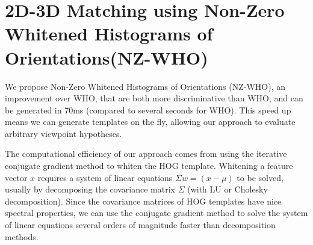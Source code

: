 \documentclass[10pt,twocolumn,letterpaper]{article}
\begin{document}

\section{2D-3D Matching using Non-Zero Whitened Histograms of Orientations(NZ-WHO)}
\label{sec:nz-who}

We propose Non-Zero Whitened Histograms of Orientations (NZ-WHO), an improvement over WHO, that are both more discriminative than WHO, and can be generated in 70ms (compared to several seconds for WHO). This speed up means we can generate templates on the fly, allowing our approach to evaluate arbitrary viewpoint hypotheses. 

The computational efficiency of our approach comes from using the iterative conjugate gradient method to whiten the HOG template. Whitening a feature vector $x$ requires a system of linear equations $\Sigma w = (x - \mu)$ to be solved, usually by decomposing the covariance matrix $\Sigma$ (with LU or Cholesky decomposition). Since the covariance matrices of HOG templates have nice spectral properties, we can use the conjugate gradient method to solve the system of linear equations several orders of magnitude faster than decomposition methods.
\end{document}
